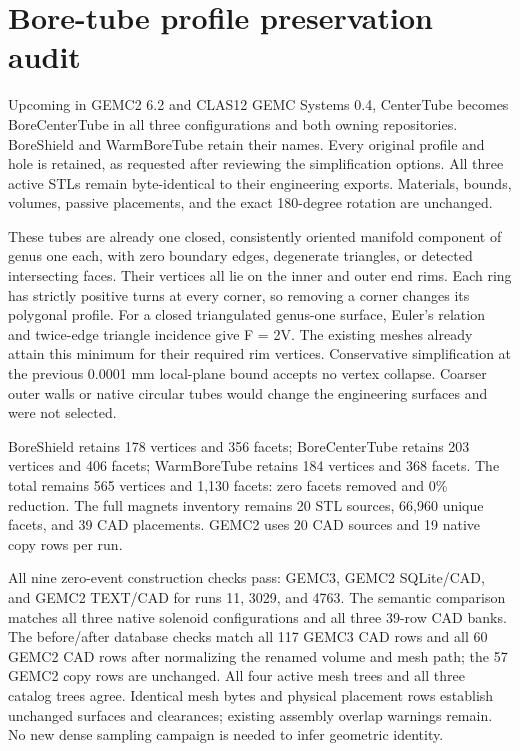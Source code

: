 \FloatBarrier
\section{Bore-tube profile preservation audit}
\label{sec:bore-tubes}

Upcoming in GEMC2 6.2 and CLAS12 GEMC Systems 0.4, CenterTube becomes BoreCenterTube in all three
configurations and both owning repositories. BoreShield and WarmBoreTube retain their names. Every original
profile and hole is retained, as requested after reviewing the simplification options. All three active STLs
remain byte-identical to their engineering exports. Materials, bounds, volumes, passive placements, and the
exact 180-degree rotation are unchanged.

These tubes are already one closed, consistently oriented manifold component of genus one each, with zero
boundary edges, degenerate triangles, or detected intersecting faces. Their vertices all lie on the inner and
outer end rims. Each ring has strictly positive turns at every corner, so removing a corner changes its
polygonal profile. For a closed triangulated genus-one surface, Euler's relation and twice-edge triangle
incidence give F = 2V. The existing meshes already attain this minimum for their required rim vertices.
Conservative simplification at the previous 0.0001 mm local-plane bound accepts no vertex collapse. Coarser
outer walls or native circular tubes would change the engineering surfaces and were not selected.

BoreShield retains 178 vertices and 356 facets; BoreCenterTube retains 203 vertices and 406 facets;
WarmBoreTube retains 184 vertices and 368 facets. The total remains 565 vertices and 1,130 facets: zero facets
removed and 0\% reduction. The full magnets inventory remains 20 STL sources, 66,960 unique facets, and 39 CAD
placements. GEMC2 uses 20 CAD sources and 19 native copy rows per run.

All nine zero-event construction checks pass: GEMC3, GEMC2 SQLite/CAD, and GEMC2 TEXT/CAD for runs 11, 3029,
and 4763. The semantic comparison matches all three native solenoid configurations and all three 39-row CAD
banks. The before/after database checks match all 117 GEMC3 CAD rows and all 60 GEMC2 CAD rows after
normalizing the renamed volume and mesh path; the 57 GEMC2 copy rows are unchanged. All four active mesh trees
and all three catalog trees agree. Identical mesh bytes and physical placement rows establish unchanged
surfaces and clearances; existing assembly overlap warnings remain. No new dense sampling campaign is needed
to infer geometric identity.

